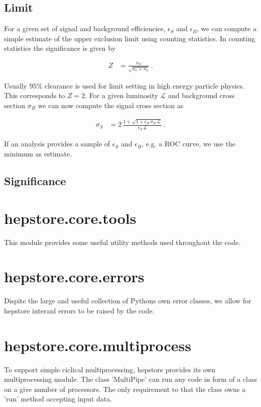 \subsection{Limit}

For a given set of signal and background efficiencies, $\epsilon_S$
and $\epsilon_B$, we can compute a simple estimate of the upper
exclusion limit using counting statistics. In counting statistics the
significance is given by
%
\begin{ceqn}
  \begin{align}
     Z &= \frac{ n_S }{ \sqrt{ n_s + n_b }}\,.
  \end{align}
\end{ceqn}
%
Usually $95\%$ clearance is used for limit setting in high energy
particle physics. This corresponds to $Z=2$. For a given luminosity
$\mathcal{L}$ and background cross section $\sigma_B$ we can now
compute the signal cross section as
%
\begin{ceqn}
  \begin{align}
     \sigma_S &= 2\,\frac{ 1 + \sqrt{ 1 + \epsilon_B\,\sigma_B\,\mathcal{L} } }{ \epsilon_S\,\mathcal{L} }\,.
  \end{align}
\end{ceqn}
%
If an analysis provides a sample of $\epsilon_S$ and $\epsilon_B$,
e.g. a ROC curve, we use the minimum as estimate.

\subsection{Significance}

\section{hepstore.core.tools}

This module provides some useful utility methods used throughout the
code.
%
\hspace*{0.5cm}
\hspace*{0.5cm}
%

\section{hepstore.core.errors}

Dispite the large and useful collection of Pythons own error classes,
we allow for hepstore interanl errors to be raised by the code.
%
\hspace*{0.5cm}
\hspace*{0.5cm}
%

\section{hepstore.core.multiprocess}

To support simple ciclical multiprocessing, hepstore provides its own
multiprocessing module. The class 'MultiPipe' can run any code in form
of a class on a give number of processors. The only requirement to
that the class owns a 'run' method accepting input data.
